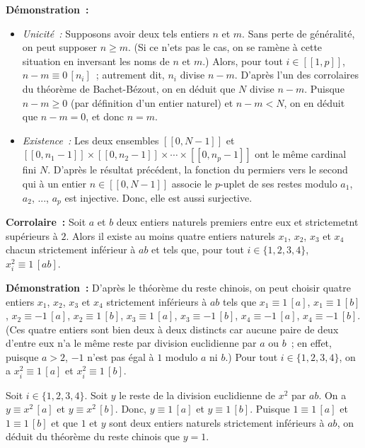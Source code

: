 \medskip

\noindent\textbf{Démonstration :} 
\begin{itemize}
    \item \textit{Unicité :} Supposons avoir deux tels entiers $n$ et $m$. 
    Sans perte de généralité, on peut supposer $n \geq m$. 
    (Si ce n'ets pas le cas, on se ramène à cette situation en inversant les noms de $n$ et $m$.)
    Alors, pour tout $i \in [\![1,p]\!]$, $n-m \equiv 0 \, [n_i]$ ; autrement dit, $n_i$ divise $n-m$. 
    D'après l'un des corrolaires du théorème de Bachet-Bézout, on en déduit que $N$ divise $n-m$. 
    Puisque $n-m \geq 0$ (par définition d'un entier naturel) et $n-m < N$, on en déduit que $n-m=0$, et donc $n=m$.
    \item \textit{Existence :} Les deux ensembles $[\![0, N-1]\!]$ et $[\![0, n_1-1]\!] \times [\![0, n_2-1]\!] \times \cdots \times [\![0, n_p-1]\!]$ ont le même cardinal fini $N$. D'après le résultat précédent, la fonction du permiers vers le second qui à un entier $n \in [\![0,N-1]\!]$ associe le $p$-uplet de ses restes modulo $a_1$, $a_2$, ..., $a_p$ est injective. Donc, elle est aussi surjective.
\end{itemize}

\done

\medskip

\noindent\textbf{Corrolaire :} Soit $a$ et $b$ deux entiers naturels premiers entre eux et strictemetnt supérieurs à $2$. Alors il existe au moins quatre entiers naturels $x_1$, $x_2$, $x_3$ et $x_4$ chacun strictement inférieur à $ab$ et tels que, pour tout $i \in \lbrace 1, 2, 3, 4 \rbrace$, $x_i^2 \equiv 1 \, [a b]$.

\medskip

\noindent\textbf{Démonstration :} 
    D'après le théorème du reste chinois, on peut choisir quatre entiers $x_1$, $x_2$, $x_3$ et $x_4$ strictement inférieurs à $ab$ tels que $x_1 \equiv 1 \, [a]$, $x_1 \equiv 1 \, [b]$, $x_2 \equiv -1 \, [a]$, $x_2 \equiv 1 \, [b]$, $x_3 \equiv 1 \, [a]$, $x_3 \equiv -1 \, [b]$, $x_4 \equiv -1 \, [a]$, $x_4 \equiv -1 \, [b]$. 
    (Ces quatre entiers sont bien deux à deux distincts car aucune paire de deux d'entre eux n'a le même reste par division euclidienne par $a$ ou $b$ ; en effet, puisque $a>2$, $-1$ n'est pas égal à $1$ modulo $a$ ni $b$.) 
    Pour tout $i \in \lbrace 1, 2, 3, 4 \rbrace$, on a $x_i^2 \equiv 1 \, [a]$ et $x_i^2 \equiv 1 \, [b]$. 
    
    Soit $i \in \lbrace 1, 2, 3, 4 \rbrace$. 
    Soit $y$ le reste de la division euclidienne de $x^2$ par $ab$. 
    On a $y \equiv x^2 \, [a]$ et $y \equiv x^2 \, [b]$. 
    Donc, $y \equiv 1 \, [a]$ et $y \equiv 1 \, [b]$. 
    Puisque $1 \equiv 1 \, [a]$ et $1 \equiv 1 \, [b]$ et que $1$ et $y$ sont deux entiers naturels strictement inférieurs à $a b$, on déduit du théorème du reste chinois que $y = 1$.  

